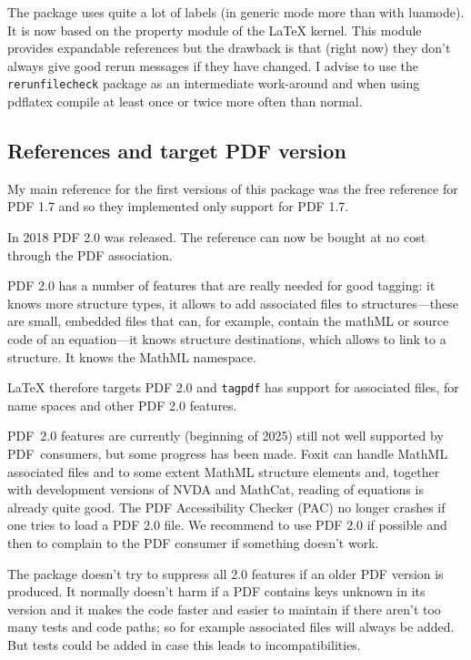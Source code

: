 \documentclass[bibliography=totoc,a4paper]{article}
\newcommand\pkg[1]{\texttt{#1}}
\newcommand\PDF{PDF}
\begin{document}
The package uses quite a lot of labels (in generic mode more than with luamode). 
It is now based on the property module of the \LaTeX{} kernel. This module 
provides expandable references but the drawback is that (right now) they don't always give 
good rerun messages if they have changed. I advise to use the 
\pkg{rerunfilecheck} package as an intermediate work-around and when using 
pdflatex compile at least once or twice more often than normal. 


\subsection{References and target PDF version}

My main reference for the first versions of this package was the free 
reference for \PDF{} 1.7 \parencite{pdfreference} and so they implemented 
only support for \PDF{} 1.7. 

In 2018 \PDF{} 2.0 was released. The reference can now be bought at no 
cost through the PDF association. 

\PDF{} 2.0 has a number of features that are really needed for good tagging: 
it knows more structure types, it allows to add associated files to 
structures---these are small, embedded files that can, for example, contain 
the mathML or source code of an equation---it knows structure destinations, 
which allows to link to a structure. It knows the MathML namespace. 

\LaTeX{} therefore targets \PDF{} 2.0 and \pkg{tagpdf} has support for 
associated files, for name spaces and other \PDF{} 2.0 features.

\PDF{}~2.0 features are currently (beginning of 2025) still not well supported by 
\PDF~consumers, but some progress has been made. Foxit can handle MathML associated files
and to some extent MathML structure elements and,
together with development versions of NVDA and MathCat, reading of equations is already quite good. The PDF Accessibility Checker (PAC) no longer crashes 
if one tries to load a \PDF{} 2.0 file. We recommend 
to use \PDF{} 2.0 if possible and then to complain to the \PDF{} consumer if 
something doesn't work.   

The package doesn't try to suppress all 2.0 features if an older \PDF{} 
version is produced. It normally doesn't harm if a \PDF{} contains keys 
unknown in its version and it makes the code faster and easier to maintain if 
there aren't too many tests and code paths; so for example associated files 
will always be added. But tests could be added in case this leads to 
incompatibilities. 
\end{document}
